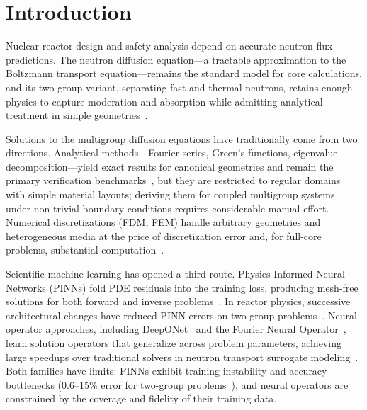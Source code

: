 \section{Introduction}
\label{sec:introduction}

Nuclear reactor design and safety analysis depend on accurate neutron flux predictions.
The neutron diffusion equation---a tractable approximation to the Boltzmann transport equation---remains the standard model for core calculations, and its two-group variant, separating fast and thermal neutrons, retains enough physics to capture moderation and absorption while admitting analytical treatment in simple geometries~\cite{duderstadt1976nuclear,bell1970nuclear,lee2020nuclear}.

Solutions to the multigroup diffusion equations have traditionally come from two directions.
Analytical methods---Fourier series, Green's functions, eigenvalue decomposition---yield exact results for canonical geometries and remain the primary verification benchmarks~\cite{zanette2018fourier,williams2013fourier}, but they are restricted to regular domains with simple material layouts; deriving them for coupled multigroup systems under non-trivial boundary conditions requires considerable manual effort.
Numerical discretizations (FDM, FEM) handle arbitrary geometries and heterogeneous media at the price of discretization error and, for full-core problems, substantial computation~\cite{lee2020nuclear,kuridan2023neutron}.

Scientific machine learning has opened a third route.
Physics-Informed Neural Networks (PINNs) fold PDE residuals into the training loss, producing mesh-free solutions for both forward and inverse problems~\cite{raissi2019pinn}.
In reactor physics, successive architectural changes have reduced PINN errors on two-group problems~\cite{elhareef2022pinn,tlpinn2023,naspinn2025}.
Neural operator approaches, including DeepONet~\cite{lu2021deeponet} and the Fourier Neural Operator~\cite{li2021fno}, learn solution operators that generalize across problem parameters, achieving large speedups over traditional solvers in neutron transport surrogate modeling~\cite{kobayashi2024deeponet}.
Both families have limits: PINNs exhibit training instability and accuracy bottlenecks (0.6--15\% error for two-group problems~\cite{elhareef2022pinn}), and neural operators are constrained by the coverage and fidelity of their training data.

